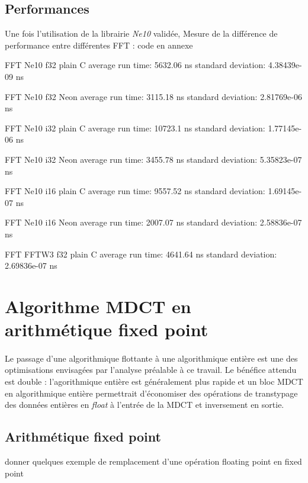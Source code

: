 \documentclass{article}
\begin{document}
    \subsection{Performances}
    Une fois l'utilisation de la librairie \emph{Ne10} validée,  Mesure de la différence de performance entre différentes FFT : code en annexe

    FFT Ne10 f32 plain C
    average run time:   5632.06 ns
    standard deviation: 4.38439e-09 ns

    FFT Ne10 f32 Neon
    average run time:   3115.18 ns
    standard deviation: 2.81769e-06 ns

    FFT Ne10 i32 plain C
    average run time:   10723.1 ns
    standard deviation: 1.77145e-06 ns

    FFT Ne10 i32 Neon
    average run time:   3455.78 ns
    standard deviation: 5.35823e-07 ns

    FFT Ne10 i16 plain C
    average run time:   9557.52 ns
    standard deviation: 1.69145e-07 ns

    FFT Ne10 i16 Neon
    average run time:   2007.07 ns
    standard deviation: 2.58836e-07 ns

    FFT FFTW3 f32 plain C
    average run time:   4641.64 ns
    standard deviation: 2.69836e-07 ns

    \section{Algorithme MDCT en arithmétique fixed point}
    \label{sec:fixed_point}
    \paragraph{}
    Le passage d'une algorithmique flottante à une algorithmique entière est une des optimisations envisagées par l'analyse préalable à ce travail. Le bénéfice attendu est double : l'agorithmique entière est généralement plus rapide et un bloc MDCT en algorithmique entière permettrait d'économiser des opérations de transtypage des données entières en \emph{float} à l'entrée de la MDCT et inversement en sortie.

    \paragraph{}



    \subsection{Arithmétique fixed point}
    donner quelques exemple de remplacement d'une opération floating point en fixed point
\end{document}
